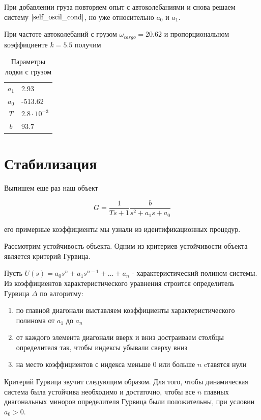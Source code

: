 \documentclass[12pt,a4paper]{article}
\begin{document}
При добавлении груза повторяем опыт с автоколебаниями и снова решаем систему $\ref{self_oscil_cond}$, но уже относительно $a_0$ и $a_1$.

При частоте автоколебаний с грузом $\omega_{cargo} = 20.62$ и пропорциональном коэффициенте $k = 5.5$ получим

\begin{table}[h]
	\caption{Параметры лодки с грузом}
	\label{table:boat_params_cargo}
	\begin{center}
		\begin{tabular}{cl}
			$a_1$ &  2.93 \\
			$a_0$ &  -513.62 \\
			$T$ & $2.8 \cdot 10^{-3}$ \\
			$b$ & 93.7 \\
		\end{tabular}
	\end{center}
\end{table}


\section{Стабилизация}

Выпишем еще раз наш объект

$$ G = \frac{1}{Ts+1} \frac{b}{s^2+a_1s+a_0} $$

его примерные коэффициенты мы узнали из идентификационных процедур.

Рассмотрим устойчивость объекта. Одним из критериев устойчивости объекта является критерий Гурвица.

Пусть $U(s) = a_0s^n + a_1s^{n-1} + \dots + a_n $ - характеристический полином системы. Из коэффициентов характеристического уравнения строится определитель Гурвица $\Delta$ по алгоритму:

\begin{enumerate}
	\item по главной диагонали выставляем коэффициенты характеристического полинома от $a_1$ до $a_n$
	\item от каждого элемента диагонали вверх и вниз достраиваем столбцы определителя так, чтобы индексы убывали сверху вниз
	\item на место коэффициентов с индекса меньше 0 или больше $n$ cтавятся нули
\end{enumerate}

Критерий Гурвица звучит следующим образом. Для того, чтобы динамическая система была устойчива необходимо и достаточно, чтобы все $n$ главных диагональных миноров определителя Гурвица были положительны, при условии $a_0 > 0$.
\end{document}

